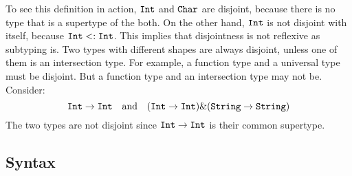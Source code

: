 
To see this definition in action, $\texttt{Int}$ and $\texttt{Char}$ are disjoint,
because there is
no type that is a supertype of the both. On the other hand, $\texttt{Int}$ is not
disjoint with itself, because $\texttt{Int} <: \texttt{Int}$. This implies that
disjointness is not reflexive as subtyping is. Two types with different shapes
are always disjoint, unless one of them is an intersection type. For example, a function
type and a universal type must be disjoint. But a function type and an intersection
type may not be. Consider:
\[ \texttt{Int} \to \texttt{Int} \quad \text{and} \quad (\texttt{Int} \to \texttt{Int}) \& (\texttt{String} \to \texttt{String}) \]
The two types are not disjoint since $\texttt{Int} \to \texttt{Int}$ is their common supertype.



\subsection{Syntax}

